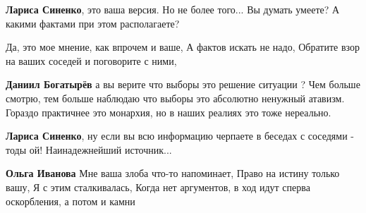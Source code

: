 \begin{itemize}
\begin{itemize}
 
\textbf{Лариса Синенко}, это ваша версия. Но не более того... Вы думать умеете? А какими фактами при этом располагаете?

 
Да, это мое мнение, как впрочем и ваше, А фактов искать не надо, Обратите взор на ваших соседей и поговорите с ними,

 
\textbf{Даниил Богатырёв} а вы верите что выборы это решение ситуации ? Чем больше смотрю, тем больше наблюдаю что выборы это абсолютно ненужный атавизм. Гораздо практичнее это монархия, но в наших реалиях это тоже нереально.

 
\textbf{Лариса Синенко}, ну если вы всю информацию черпаете в беседах с соседями - тоды ой!
Наинадежнейший источник...

 
\textbf{Ольга Иванова} Мне ваша злоба что-то напоминает, Право на истину только вашу, Я с этим сталкивалась, Когда нет аргументов, в ход идут сперва оскорбления, а потом и камни

 

\end{itemize}
\end{itemize}
